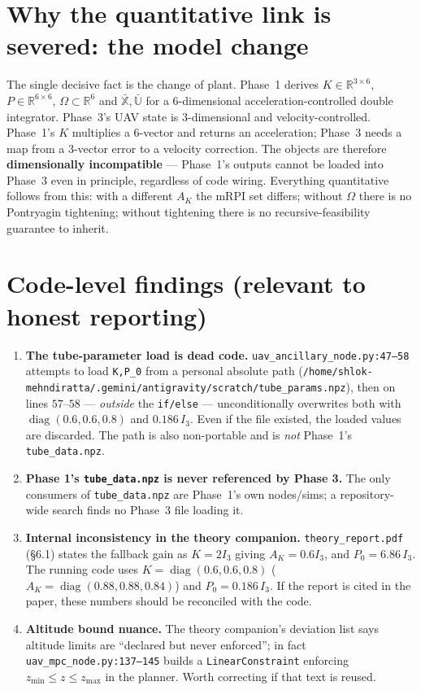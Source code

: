 \documentclass[11pt]{article}
\DeclareMathOperator{\diag}{diag}
\newcommand{\R}{\mathbb{R}}
\newcommand{\Xset}{\mathbb{X}}
\newcommand{\Uset}{\mathbb{U}}
\newcommand{\code}[1]{\texttt{#1}}
\begin{document}
\section{Why the quantitative link is severed: the model change}
The single decisive fact is the change of plant. Phase~1 derives $K\in\R^{3\times6}$, $P\in\R^{6\times6}$,
$\Omega\subset\R^6$ and $\bar{\Xset},\bar{\Uset}$ for a $6$-dimensional acceleration-controlled double
integrator. Phase~3's UAV state is $3$-dimensional and velocity-controlled. Phase~1's $K$ multiplies
a $6$-vector and returns an acceleration; Phase~3 needs a map from a $3$-vector error to a velocity
correction. The objects are therefore \textbf{dimensionally incompatible} --- Phase~1's outputs
cannot be loaded into Phase~3 even in principle, regardless of code wiring. Everything quantitative
follows from this: with a different $A_K$ the mRPI set differs; without $\Omega$ there is no
Pontryagin tightening; without tightening there is no recursive-feasibility guarantee to inherit.

\section{Code-level findings (relevant to honest reporting)}
\begin{enumerate}[leftmargin=1.4em]
\item \textbf{The tube-parameter load is dead code.} \code{uav\_ancillary\_node.py:47--58} attempts
to load \code{K,P\_0} from a personal absolute path
(\code{/home/shlok-mehndiratta/.gemini/antigravity/scratch/tube\_params.npz}), then on lines
$57$--$58$ --- \emph{outside} the \code{if/else} --- unconditionally overwrites both with
$\diag(0.6,0.6,0.8)$ and $0.186\,I_3$. Even if the file existed, the loaded values are discarded.
The path is also non-portable and is \emph{not} Phase~1's \code{tube\_data.npz}.
\item \textbf{Phase 1's \code{tube\_data.npz} is never referenced by Phase 3.} The only consumers of
\code{tube\_data.npz} are Phase~1's own nodes/sims; a repository-wide search finds no Phase~3 file
loading it.
\item \textbf{Internal inconsistency in the theory companion.} \code{theory\_report.pdf}
(\S6.1) states the fallback gain as $K=2I_3$ giving $A_K=0.6I_3$, and $P_0=6.86\,I_3$. The running
code uses $K=\diag(0.6,0.6,0.8)$ ($A_K=\diag(0.88,0.88,0.84)$) and $P_0=0.186\,I_3$. If the report
is cited in the paper, these numbers should be reconciled with the code.
\item \textbf{Altitude bound nuance.} The theory companion's deviation list says altitude limits are
``declared but never enforced''; in fact \code{uav\_mpc\_node.py:137--145} builds a
\code{LinearConstraint} enforcing $z_{\min}\le z\le z_{\max}$ in the planner. Worth correcting if
that text is reused.
\end{enumerate}
\end{document}
